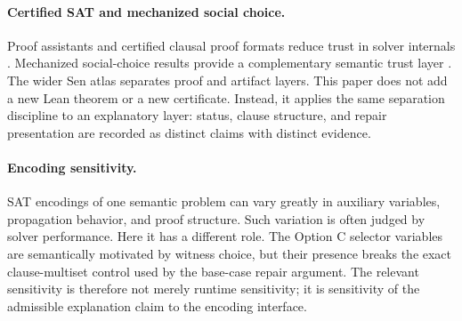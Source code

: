 \paragraph{Certified SAT and mechanized social choice.}
Proof assistants and certified clausal proof formats reduce trust in solver
internals \citep{moura2021lean4,cruzfilipe2017lrat,wetzler2014drat}.
Mechanized social-choice results provide a complementary semantic trust layer
\citep{nipkow2009social}.  The wider Sen atlas separates proof and artifact
layers.  This paper does not add a new Lean theorem or a new certificate.
Instead, it applies the same separation discipline to an explanatory layer:
status, clause structure, and repair presentation are recorded as distinct
claims with distinct evidence.

\paragraph{Encoding sensitivity.}
SAT encodings of one semantic problem can vary greatly in auxiliary variables,
propagation behavior, and proof structure.  Such variation is often judged by
solver performance.  Here it has a different role.  The Option C selector
variables are semantically motivated by witness choice, but their presence
breaks the exact clause-multiset control used by the base-case repair argument.
The relevant sensitivity is therefore not merely runtime sensitivity; it is
sensitivity of the admissible explanation claim to the encoding interface.
